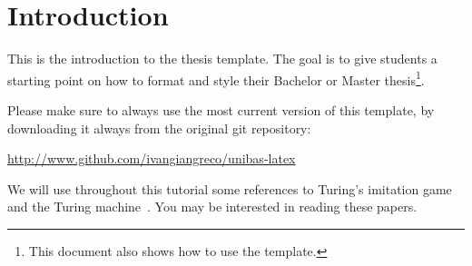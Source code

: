 \chapter{Introduction}

This is the introduction to the thesis template. The goal is to give students a starting point on how to format and style their Bachelor or Master thesis\footnote{This document also shows how to use the template.}. 

Please make sure to always use the most current version of this template, by downloading it always from the original git repository:
\begin{center}
	\url{http://www.github.com/ivangiangreco/unibas-latex} 
\end{center}

We will use throughout this tutorial some references to Turing's imitation game~\cite{turing:1950} and the Turing machine~\cite{turing:1936}. You may be interested in reading these papers.

